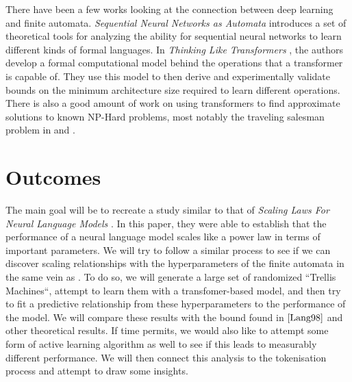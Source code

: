 \documentclass[11pt]{article}
\begin{document}
There have been a few works looking at the connection between deep learning and
finite automata. \textit{Sequential Neural Networks as Automata} \cite{snnaa}
introduces a set of theoretical tools for analyzing the ability for sequential
neural networks to learn different kinds of formal languages. In \textit{Thinking Like
Transformers} \cite{thinkingliketransformers}, the authors develop a
formal computational model behind the operations that a transformer is capable
of. They use this model to then derive and experimentally validate bounds on the
minimum architecture size required to learn different operations. There is also
a good amount of work on using transformers to find approximate solutions to
known NP-Hard problems, most notably the traveling salesman problem in
\cite{wouter} and \cite{otherTSP}.

\section{Outcomes}

The main goal will be to recreate a study similar to that of \textit{Scaling
Laws For Neural Language Models} \cite{scalinglaws}. In this paper, they were
able to establish that the performance of a neural language model scales like a
power law in terms of important parameters. We will try to follow a similar
process to see if we can discover scaling relationships with the hyperparameters
of the finite automata in the same vein as \cite{Lang98}. To do so, we will
generate a large set of randomized ``Trellis Machines``, attempt to learn them
with a transfomer-based model,  and then try to fit a
predictive relationship from these hyperparameters to the performance of the
model. We will compare these results with the bound found in $\cite{Lang98}$ and
other theoretical results. If time permits, we would also like to attempt some
form of active learning algorithm as well to see if this leads to measurably
different  performance. We will then connect this analysis to the tokenisation
process and attempt to draw some insights.



\end{document}
